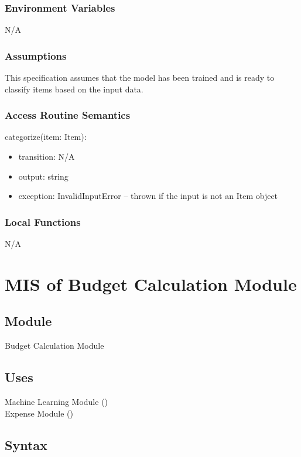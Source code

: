 \documentclass[12pt, titlepage]{article}
\begin{document}
\subsubsection{Environment Variables}
N/A

\subsubsection{Assumptions}
This specification assumes that the model has been trained and is ready to
classify items based on the input data.

\subsubsection{Access Routine Semantics}

\noindent categorize(item: Item):
\begin{itemize}
\item transition: N/A 
\item output: string 
\item exception: InvalidInputError -- thrown if the input is not an Item object
\end{itemize}

\subsubsection{Local Functions}
N/A

\newpage



\section{MIS of Budget Calculation Module}\label{budget_calculation_module}

\subsection{Module}

Budget Calculation Module

\subsection{Uses}
Machine Learning Module ()\\
Expense Module ()

\subsection{Syntax}
\end{document}
